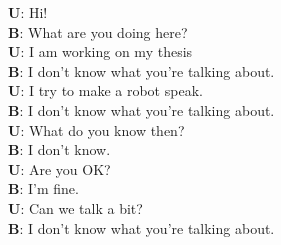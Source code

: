 
\setlength{\abovedisplayskip}{20pt}
\setlength{\belowdisplayskip}{20pt}

\small
\textbf{U}: Hi!\\\indent
\textbf{B}: What are you doing here?\\\indent
\textbf{U}: I am working on my thesis\\\indent
\textbf{B}: I don't know what you're talking about.\\\indent
\textbf{U}: I try to make a robot speak.\\\indent
\textbf{B}: I don't know what you're talking about.\\\indent
\textbf{U}: What do you know then?\\\indent
\textbf{B}: I don't know.\\\indent
\textbf{U}: Are you OK?\\\indent
\textbf{B}: I'm fine.\\\indent
\textbf{U}: Can we talk a bit?\\\indent
\textbf{B}: I don't know what you're talking about.\\

\normalsize